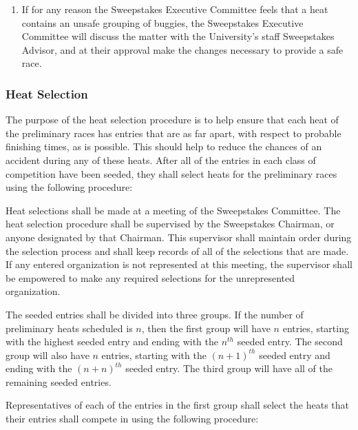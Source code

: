 \begin{enumerate}
		\item If for any reason the Sweepstakes Executive Committee feels that a heat contains an unsafe grouping of buggies, the Sweepstakes Executive Committee will discuss the matter with the University's staff Sweepstakes Advisor, and at their approval make the changes necessary to provide a safe race.

	\end{enumerate}

\subsubsection{Heat Selection}

	The purpose of the heat selection procedure is to help ensure that each heat of the preliminary races has entries that are as far apart, with respect to probable finishing times, as is possible. This should help to reduce the chances of an accident during any of these heats. After all of the entries in each class of competition have been seeded, they shall select heats for the preliminary races using the following procedure:

	Heat selections shall be made at a meeting of the Sweepstakes Committee. The heat selection procedure shall be supervised by the Sweepstakes Chairman, or anyone designated by that Chairman. This supervisor shall maintain order during the selection process and shall keep records of all of the selections that are made. If any entered organization is not represented at this meeting, the supervisor shall be empowered to make any required selections for the unrepresented organization.

	The seeded entries shall be divided into three groups. If the number of preliminary heats scheduled is $n$, then the first group will have $n$ entries, starting with the highest seeded entry and ending with the $n^{th}$ seeded entry. The second group will also have $n$ entries, starting with the $(n+1)^{th}$ seeded entry and ending with the $(n+n)^{th}$ seeded entry. The third group will have all of the remaining seeded entries.

	Representatives of each of the entries in the first group shall select the heats that their entries shall compete in using the following procedure:

